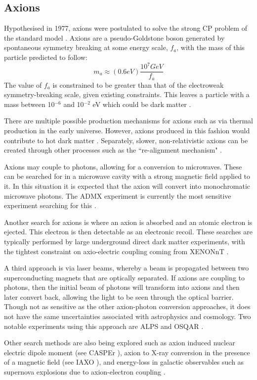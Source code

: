 \subsection{Axions}
\par
Hypothesised in 1977, axions were postulated to solve the strong CP problem of the standard model \cite{axion_origins_ref}.
Axions are a pseudo-Goldstone boson generated by spontaneous symmetry breaking at some energy scale, $f_a$, with the mass of this particle predicted to follow:
\begin{equation}
    m_a \approx (0.6 eV)\frac{10^7 GeV}{f_a}
\end{equation}
The value of $f_a$ is constrained to be greater than that of the electroweak symmetry-breaking scale, given existing constraints.
This leaves a particle with a mass between 10${}^{-6}$ and 10${}^{-2}$ eV which could be dark matter \cite{axions_ref}.
\par
There are multiple possible production mechanisms for axions such as via thermal production in the early universe.
However, axions produced in this fashion would contribute to hot dark matter \cite{hot_axions_ref}.
Separately, slower, non-relativistic axions can be created through other processes such as the ``re-alignment mechanism" \cite{cold_axion_ref}.
\par
Axions may couple to photons, allowing for a conversion to microwaves.
These can be searched for in a microwave cavity with a strong magnetic field applied to it.
In this situation it is expected that the axion will convert into monochromatic microwave photons.
The ADMX experiment is currently the most sensitive experiment searching for this \cite{admx_experiment_ref}.
\par
Another search for axions is where an axion is absorbed and an atomic electron is ejected.
This electron is then detectable as an electronic recoil.
These searches are typically performed by large underground direct dark matter experiments, with the tightest constraint on axio-electric coupling coming from XENONnT \cite{xenonnt_sr1_er_ref}.
\par
A third approach is via laser beams, whereby a beam is propagated between two superconducting magnets that are optically separated.
If axions are coupling to photons, then the initial beam of photons will transform into axions and then later convert back, allowing the light to be seen through the optical barrier.
Though not as sensitive as the other axion-photon conversion approaches, it does not have the same uncertainties associated with astrophysics and cosmology.
Two notable experiments using this approach are ALPS \cite{alps_axion_result_ref} and OSQAR \cite{osqar_axion_result_ref}. 
\par
Other search methods are also being explored such as axion induced nuclear electric dipole moment (see CASPEr \cite{casper_experiment_ref}), axion to X-ray conversion in the presence of a magnetic field (see IAXO \cite{iaxo_experiment_ref}), and energy-loss in galactic observables such as supernova explosions due to axion-electron coupling \cite{axions_from_supernova_ref}.

